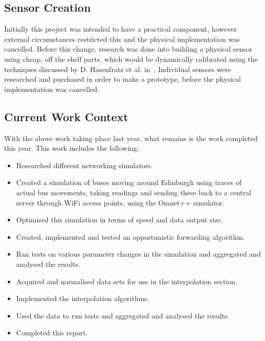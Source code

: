     \subsection{Sensor Creation}

        Initially this project was intended to have a practical component, however external circumstances restricted this and the physical implementation was cancelled. Before this change, research was done into building a physical sensor using cheap, off the shelf parts, which would be dynamically calibrated using the techniques discussed by D. Hasenfratz et al. in~\cite{ontheflycalibration}. Individual sensors were researched and purchased in order to make a prototype, before the physical implementation was cancelled. 

    \subsection{Current Work Context}

        With the above work taking place last year, what remains is the work completed this year. This work includes the following:

        \begin{itemize}
            \item Researched different networking simulators.
            \item Created a simulation of buses moving around Edinburgh using traces of actual bus movements, taking readings and sending these back to a central server through WiFi access points, using the Omnet++ simulator.
            \item Optimised this simulation in terms of speed and data output size.
            \item Created, implemented and tested an opportunistic forwarding algorithm.
            \item Ran tests on various parameter changes in the simulation and aggregated and analysed the results.
            \item Acquired and normalised data sets for use in the interpolation section.
            \item Implemented the interpolation algorithms.
            \item Used the data to run tests and aggregated and analysed the results.
            \item Completed this report.
        \end{itemize}
    

